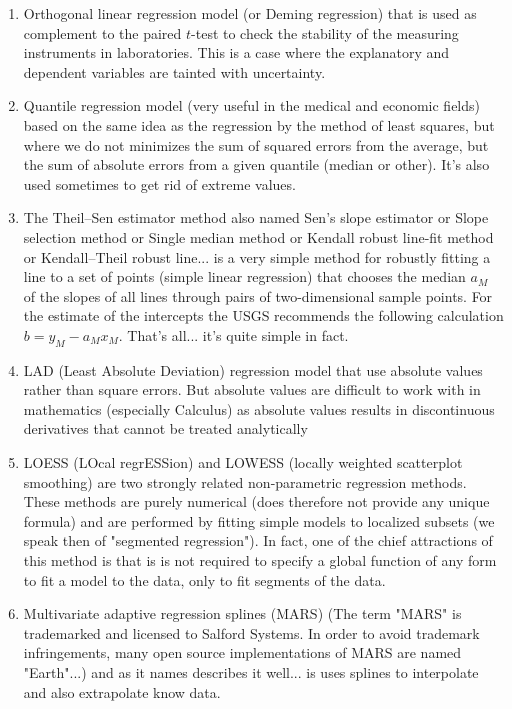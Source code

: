 \begin{enumerate}
		\item Orthogonal linear regression model (or Deming regression) that is used as complement to the paired $t$-test to check the stability of the measuring instruments in laboratories. This is a case where the explanatory and dependent variables are tainted with uncertainty.
		
		\item Quantile regression model (very useful in the medical and economic fields) based on the same idea as the regression by the method of least squares, but where we do not minimizes the sum of squared errors from the average, but the sum of absolute errors from a given quantile (median or other). It's also used sometimes to get rid of extreme values.
		
		\item The Theil–Sen estimator method also named Sen's slope estimator or Slope selection method or Single median method or Kendall robust line-fit method or Kendall–Theil robust line... is a very simple method for robustly fitting a line to a set of points (simple linear regression) that chooses the median $a_M$ of the slopes of all lines through pairs of two-dimensional sample points. For the estimate of the intercepts the USGS recommends the following calculation $b=y_M-a_Mx_M$. That's all... it's quite simple in fact.
		
		\item LAD (Least Absolute Deviation) regression model that use absolute values rather than square errors.  But absolute values are difficult to work with in mathematics (especially Calculus) as absolute values results in discontinuous derivatives that cannot be treated analytically
		
		\item LOESS (LOcal regrESSion) and LOWESS (locally weighted scatterplot smoothing) are two strongly related non-parametric regression methods. These methods are purely numerical (does therefore not provide any unique formula) and are performed by fitting simple models to localized subsets (we speak then of "segmented regression"). In fact, one of the chief attractions of this method is that is is not required to specify a global function of any form to fit a model to the data, only to fit segments of the data.
		
		\item Multivariate adaptive regression splines (MARS) (The term "MARS" is trademarked and licensed to Salford Systems. In order to avoid trademark infringements, many open source implementations of MARS are named "Earth"...) and as it names describes it well... is uses splines to interpolate and also extrapolate know data.
		

\end{enumerate}
